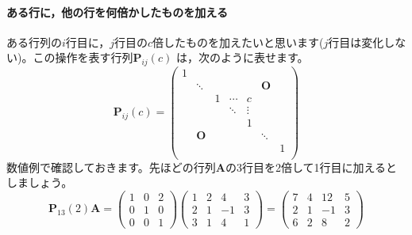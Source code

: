 \documentclass{ltjsbook}
\begin{document}
\paragraph{ある行に，他の行を何倍かしたものを加える}
ある行列の$i$行目に，$j$行目の$c$倍したものを加えたいと思います($j$行目は変化しない)。この操作を表す行列$\bm{P}_{ij}(c)$ は，次のように表せます。
\[
	\bm{P}_{ij}(c) = \begin{pmatrix}
		1 &        &   &        &        &        &   \\
		  & \ddots &   &        &        & \bm{O} &   \\
		  &        & 1 & \cdots & c      &        &   \\
		  &        &   & \ddots & \vdots &        &   \\
		  &        &   &        & 1      &        &   \\
		  & \bm{O} &   &        &        & \ddots &   \\
		  &        &   &        &        &        & 1 \\
	\end{pmatrix}
\]
数値例で確認しておきます。先ほどの行列$\bm{A}$の3行目を2倍して1行目に加えるとしましょう。
\[
	\bm{P}_{13}(2)\bm{A} =
	\begin{pmatrix} 1 & 0 & 2 \\ 0 & 1 & 0 \\ 0 & 0 & 1 \end{pmatrix}
	\begin{pmatrix} 1 & 2 & 4 & 3 \\ 2 & 1 & -1 & 3 \\ 3 & 1 & 4 & 1 \end{pmatrix}
	=
	\begin{pmatrix} 7 & 4 & 12 & 5 \\ 2 & 1 & -1 & 3 \\ 6 & 2 & 8 & 2 \end{pmatrix}
\]
\end{document}
